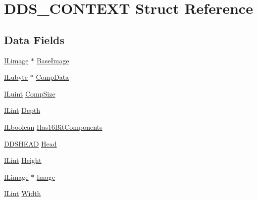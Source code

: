 \hypertarget{struct_d_d_s___c_o_n_t_e_x_t}{\section{D\-D\-S\-\_\-\-C\-O\-N\-T\-E\-X\-T Struct Reference}
\label{struct_d_d_s___c_o_n_t_e_x_t}
}
\subsection*{Data Fields}
\begin{DoxyCompactItemize}
\item 
\hyperlink{struct_i_limage}{I\-Limage} $\ast$ \hyperlink{struct_d_d_s___c_o_n_t_e_x_t_afb56f9697ee1979e62ddda6fe1ef49ce}{Base\-Image}
\item 
\hyperlink{il_8h_a8d2f04500100a86d1b00e98ab1b15a33}{I\-Lubyte} $\ast$ \hyperlink{struct_d_d_s___c_o_n_t_e_x_t_abacb6fbe654988a51df7ce266c73dfb7}{Comp\-Data}
\item 
\hyperlink{il_8h_ac6508d0e9c19e32f32e00d54b5b8cf30}{I\-Luint} \hyperlink{struct_d_d_s___c_o_n_t_e_x_t_aca36d9fb5305148faf6682cd2558cf38}{Comp\-Size}
\item 
\hyperlink{il_8h_a288a97fb9e92e707a60b749d0039fafe}{I\-Lint} \hyperlink{struct_d_d_s___c_o_n_t_e_x_t_ab1eae80483c0ec4d2e904165edc82c1e}{Depth}
\item 
\hyperlink{il_8h_a8be80d75c2c636b9f2250fe10c2e7874}{I\-Lboolean} \hyperlink{struct_d_d_s___c_o_n_t_e_x_t_a014e5bbb41cbfb529d5d3560d4b9828d}{Has16\-Bit\-Components}
\item 
\hyperlink{struct_d_d_s_h_e_a_d}{D\-D\-S\-H\-E\-A\-D} \hyperlink{struct_d_d_s___c_o_n_t_e_x_t_a2bc50ce693cbf4803e197d1355bf300f}{Head}
\item 
\hyperlink{il_8h_a288a97fb9e92e707a60b749d0039fafe}{I\-Lint} \hyperlink{struct_d_d_s___c_o_n_t_e_x_t_a6ab8e5a8c7842b5a57104e36b9a49f33}{Height}
\item 
\hyperlink{struct_i_limage}{I\-Limage} $\ast$ \hyperlink{struct_d_d_s___c_o_n_t_e_x_t_a3886f625b62940075991f33d913127d0}{Image}
\item 
\hyperlink{il_8h_a288a97fb9e92e707a60b749d0039fafe}{I\-Lint} \hyperlink{struct_d_d_s___c_o_n_t_e_x_t_a0bebc214dbd5f199ad36aefd13feb6e7}{Width}
\end{DoxyCompactItemize}


